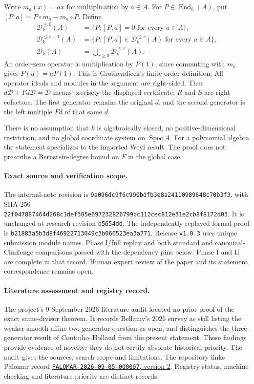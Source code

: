 \documentclass[11pt,a4paper]{article}
\newcommand{\code}[1]{\nolinkurl{#1}}
\newcommand{\D}{\mathcal D}
\begin{document}
Write $m_a(x)=ax$ for multiplication by $a\in A$. For $P\in\operatorname{End}_k(A)$,
put $[P,a]=P\circ m_a-m_a\circ P$. Define
\[
\begin{aligned}
\D^{\le0}_k(A)&=\{P:[P,a]=0\text{ for every }a\in A\},\\
\D^{\le r+1}_k(A)&=\{P:[P,a]\in\D^{\le r}_k(A)\text{ for every }a\in A\},\\
\D_k(A)&=\bigcup_{r\ge0}\D^{\le r}_k(A).
\end{aligned}
\]
An order-zero operator is multiplication by $P(1)$, since commuting with
$m_a$ gives $P(a)=aP(1)$. This is Grothendieck's finite-order definition.
All operator ideals and modules in the argument are right-sided. Thus
$d\D+Fd\D=\D$ means precisely the displayed certificate; $R$ and $S$ are
right cofactors. The first generator remains the original $d$, and the
second generator is the left multiple $Fd$ of that same $d$.

There is no assumption that $k$ is algebraically closed, no positive-dimensional
restriction, and no global coordinate system on $\operatorname{Spec} A$.
For a polynomial algebra the statement specializes to the imported Weyl result.
The proof does not prescribe a Bernstein-degree bound on $F$ in the global case.

\paragraph{Exact source and verification scope.}
The internal-note revision is \nolinkurl{9a096dc9f6c990bdfb3e8a24110989648c70b3f3}, with
SHA-256 \nolinkurl{22f047887464d268c1def305e697232826799bc112cec812e31e2cb8f8172d03}.
It is unchanged at research revision \code{b5654dd}. The independently replayed
formal proof is \nolinkurl{b21883a5b3d8f46922713049c3b060523ea3a771}.
Release \code{v1.0.3} uses unique submission module names. Phase I/full replay and both standard and canonical-Challenge comparisons passed with the dependency pins below.
Phase I and II are complete in that record. Human expert review of the paper and
its statement correspondence remains open.

\paragraph{Literature assessment and registry record.}
The project's 9 September 2026 literature audit located no prior proof of the
exact same-divisor theorem. It records Bellamy's 2026 survey as still listing
the weaker smooth-affine two-generator question as open, and distinguishes
the three-generator result of Coutinho--Holland from the present statement.
These findings provide evidence of novelty; they do not certify absolute
historical priority. The audit gives the sources, search scope and limitations.
The repository links Palomar record
\href{https://palomar-registry.org/entry?id=PALOMAR-2026-09-05-000007&version=2}{\code{PALOMAR-2026-09-05-000007}, version 2}.
Registry status, machine checking and literature priority are distinct records.
\end{document}
